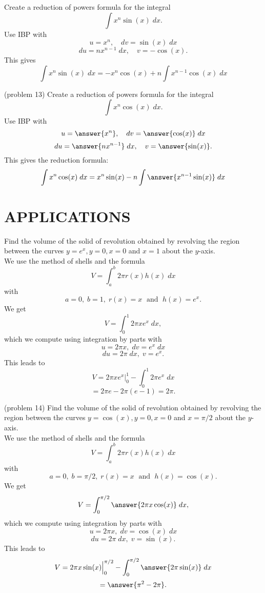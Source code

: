 \documentclass{ximera}
\begin{document}
\begin{example}[example 13]
Create a reduction of powers formula for the integral
\[
\int x^n\sin(x) \; dx.
\]
Use IBP with
\[
u = x^n, \quad dv = \sin(x) \; dx
\]
\[
du = nx^{n-1}\; dx,  \quad v = -\cos(x).
\]
This gives
\[
\int x^n\sin(x) \; dx = -x^n\cos(x) + n\int x^{n-1}\cos(x) \; dx
\]
\end{example}

\begin{problem}(problem 13)
Create a reduction of powers formula for the integral
\[
\int x^n\cos(x) \; dx.
\]
Use IBP with
\[
u = \answer{x^n}, \quad dv = \answer{\cos(x)} \; dx
\]
\[
du = \answer{nx^{n-1}}\; dx,  \quad v = \answer{\sin(x)}.
\]
This gives the reduction formula:
\[
\int x^n\cos(x) \; dx = x^n\sin(x) - n\int \answer{x^{n-1}\sin(x)} \; dx
\]
\end{problem}




\section{APPLICATIONS}

\begin{example}[example 14]
Find the volume of the solid of revolution obtained by revolving the region between the curves $y = e^x, y = 0, x = 0$
and $x = 1$ about the $y$-axis.\\


We use the method of shells and the formula
\[
V = \int_a^b 2\pi r(x)h(x) \; dx
\]
with
\[
a = 0,\; b = 1, \; r(x) = x \; \text{ and } \; h(x) = e^x.
\]
We get
\[
V = \int_0^1 2\pi xe^x \; dx,
\]
which we compute using integration by parts with
\[
u = 2\pi x, \; dv = e^x \; dx
\]
\[
du = 2\pi \;dx, \; v = e^x.
\]
This leads to 
\[
V = 2\pi xe^x \Big|_0^1 - \int_0^1 2\pi e^x \; dx
\] 
\[
= 2\pi e - 2\pi (e-1) = 2\pi.
\]
\end{example} 

\begin{problem}(problem 14)
Find the volume of the solid of revolution obtained by revolving the region between the curves $y = \cos(x), y = 0, x = 0$
and $x = \pi/2$ about the $y$-axis.\\


We use the method of shells and the formula
\[
V = \int_a^b 2\pi r(x)h(x) \; dx
\]
with
\[
a = 0,\; b = \pi/2, \; r(x) = x \; \text{ and } \; h(x) = \cos(x).
\]
We get
\[
V = \int_0^{\pi/2} \answer{2\pi x \cos(x)} \; dx,
\]
which we compute using integration by parts with
\[
u = 2\pi x, \; dv = \cos(x) \; dx
\]
\[
du = 2\pi \;dx, \; v = \sin(x).
\]
This leads to 
\[
V = 2\pi x\sin(x) \Big|_0^{\pi/2} - \int_0^{\pi/2} \answer{2\pi \sin(x)} \; dx
\] 
\[
= \answer{\pi^2 - 2\pi}.
\]
\end{problem} 
\end{document}
